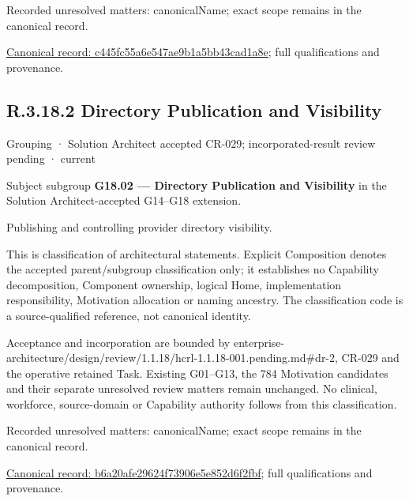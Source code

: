 {\small Recorded unresolved matters: canonicalName; exact scope remains in the canonical record.}\par
{\footnotesize \href{../../../../continuum/grouping/c445fc55a6e547ae9b1a5bb43cad1a8e.md}{Canonical record: c445fc55a6e547ae9b1a5bb43cad1a8e}; full qualifications and provenance.}\par
\subsection*{R.3.18.2 Directory Publication and Visibility}
\label{navigation:R.3.18.2}

\label{element:b6a20afe29624f73906e5e852d6f2fbf}
{\small Grouping · Solution Architect accepted CR-029; incorporated-result review pending · current}\par

Subject subgroup \textbf{G18.02 — Directory Publication and Visibility} in the Solution Architect-accepted G14–G18 extension.



Publishing and controlling provider directory visibility.



This is classification of architectural statements. Explicit Composition denotes the accepted parent/subgroup classification only; it establishes no Capability decomposition, Component ownership, logical Home, implementation responsibility, Motivation allocation or naming ancestry. The classification code is a source-qualified reference, not canonical identity.



Acceptance and incorporation are bounded by enterprise-architecture/design/review/1.1.18/hcrl-1.1.18-001.pending.md\#dr-2, CR-029 and the operative retained Task. Existing G01–G13, the 784 Motivation candidates and their separate unresolved review matters remain unchanged. No clinical, workforce, source-domain or Capability authority follows from this classification.


{\small Recorded unresolved matters: canonicalName; exact scope remains in the canonical record.}\par
{\footnotesize \href{../../../../continuum/grouping/b6a20afe29624f73906e5e852d6f2fbf.md}{Canonical record: b6a20afe29624f73906e5e852d6f2fbf}; full qualifications and provenance.}\par
